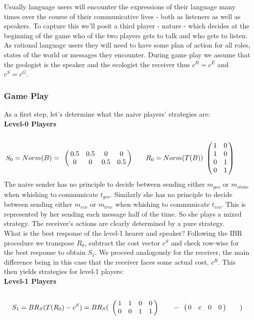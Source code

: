 \documentclass[10]{article}
\begin{document}
Usually language users will encounter the expressions of their language many times over the course of their communicative lives - both as listeners as well as speakers. To capture this we'll posit a third player - nature - which decides at the beginning of the game who of the two players gets to talk and who gets to listen. As rational language users they will need to have some plan of action for all roles, states of the world or messages they encounter. During game play we assume that the geologist is the speaker and the ecologist the receiver thus $c^R=c^E$ and $c^S=c^G$.

\subsubsection{Game Play}
As a first step, let's determine what the naive players' strategies are:\\
\textbf{Level-0 Players}\\
\begin{equation*}
S_0=Norm(B)=
\bordermatrix{
            & & & &    \cr
 &       0.5 &         0.5 & 0       & 0 \cr
 &       0 &         0 & 0.5       & 0.5
 }\qquad
R_0=Norm(T(B))
\bordermatrix{
            &  & \cr
    & 1 & 0 \cr
     & 1 & 0 \cr
     & 0 & 1 \cr
     & 0 & 1 \cr
 }\qquad
\end{equation*}
The naive sender has no principle to decide between sending either $m_{geo}$ or $m_{stone}$ when whishing to communicate $t_{geo}$. Similarly she has no principle to decide between sending either $m_{eco}$ or $m_{tree}$ when whishing to communicate $t_{eco}$. This is represented by her sending each message half of the time. So she plays a mixed strategy. The receiver's actions are clearly determined by a pure strategy.\\
What is the best response of the level-1 hearer and speaker? Following the IBR procedure we transpose $R_0$, subtract the cost vector $c^S$ and check row-wise for the best response to obtain $S_1$. We proceed analogously for the receiver, the main difference being in this case that the receiver faces some actual cost, $c^R$. This then yields strategies for level-1 players:\\ %
\textbf{Level-1 Players}\\
\begin{equation*}
S_1= BR_S(T(R_0)-c^S)=
BR_S(
\bordermatrix{
            & & & &    \cr
 &       1 &         1 & 0       & 0 \cr
 &       0 &         0 & 1      & 1
 }\qquad
-
\bordermatrix{
            & & & &    \cr
 &       0 &         c & 0       & 0 \cr
 }\qquad
)
\end{equation*}
\end{document}
